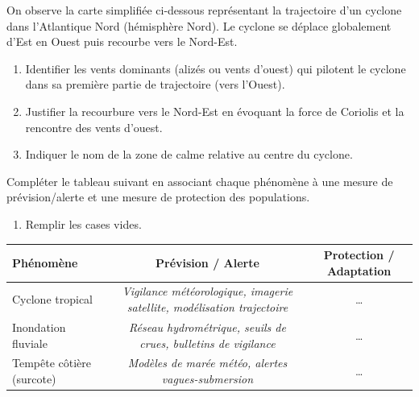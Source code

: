 \documentclass[11pt]{article}
\begin{document}
\begin{exercice}
On observe la carte simplifiée ci-dessous représentant la trajectoire d'un cyclone dans l'Atlantique Nord (hémisphère Nord). Le cyclone se déplace globalement d'Est en Ouest puis recourbe vers le Nord-Est.
\begin{center}
\end{center}
\begin{enumerate}
    \item Identifier les vents dominants (alizés ou vents d'ouest) qui pilotent le cyclone dans sa première partie de trajectoire (vers l'Ouest).
    \item Justifier la recourbure vers le Nord-Est en évoquant la force de Coriolis et la rencontre des vents d'ouest.
    \item Indiquer le nom de la zone de calme relative au centre du cyclone.
\end{enumerate}
\end{exercice}

\begin{exercice}
Compléter le tableau suivant en associant chaque phénomène à une mesure de prévision/alerte et une mesure de protection des populations.
\begin{enumerate}
    \item Remplir les cases vides.
\end{enumerate}
\begin{center}
\begin{tabularx}{\linewidth}{|X|c|c|}
\hline
\textbf{Phénomène} & \textbf{Prévision / Alerte} & \textbf{Protection / Adaptation} \\
\hline
Cyclone tropical & \textit{Vigilance météorologique, imagerie satellite, modélisation trajectoire} & \ldots \\
\hline
Inondation fluviale & \textit{Réseau hydrométrique, seuils de crues, bulletins de vigilance} & \ldots \\
\hline
Tempête côtière (surcote) & \textit{Modèles de marée météo, alertes vagues-submersion} & \ldots \\
\hline
\end{tabularx}
\end{center}
\end{exercice}
\end{document}
